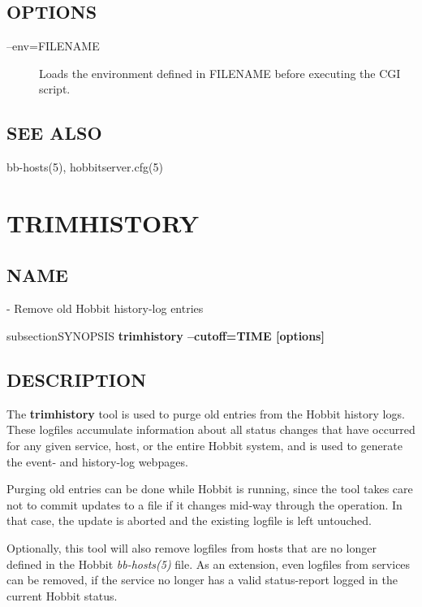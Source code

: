  
\subsection{OPTIONS}
\begin{description}
\item[--env=FILENAME] Loads the environment defined in FILENAME before executing the CGI script. 


\end{description}
\subsection{SEE ALSO}
bb-hosts(5), hobbitserver.cfg(5) 

 

%
\newpage
\section{TRIMHISTORY}
\subsection{NAME}
  - Remove old Hobbit history-log entries 

subsection{SYNOPSIS}
\textbf{trimhistory --cutoff=TIME [options]}


 
\subsection{DESCRIPTION}
 The \textbf{trimhistory}
 tool is used to purge old entries from the Hobbit history logs. These
 logfiles accumulate information about all status changes that have
 occurred for any given service, host, or the entire Hobbit system,
 and is used to generate the event- and history-log webpages. 


  Purging old entries can be done while Hobbit is running, since the
  tool takes care not to commit updates to a file if it changes
  mid-way through the operation. In that case, the update is aborted
  and the existing logfile is left untouched. 


  Optionally, this tool will also remove logfiles from hosts that are
  no longer defined in the Hobbit \emph{bb-hosts(5)} file. As an
  extension, even logfiles from services can be removed, if the
  service no longer has a valid status-report logged in the current
  Hobbit status. 

